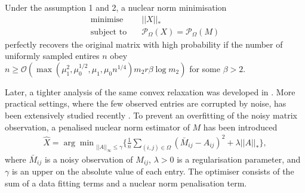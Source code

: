 \documentclass{article} %
\newcommand\mc{\mathcal} %
\begin{document}
\begin{theorem}
Under the assumption 1 and 2, a nuclear norm minimisation
\begin{align}
\text{minimise}&\quad ||X||_* \\
\text{subject to}&\quad \mc{P}_{\Omega}(X) = \mc{P}_{\Omega}(M) 
\end{align}
perfectly recovers the original matrix with high probability if the number of uniformly sampled entires $n$ obey $n\geq \mathcal{O}(\max(\mu_1^2,\mu_0^{1/2},\mu_1,\mu_0n^{1/4}) m_2 r \beta \log m_2)$ for some $\beta > 2$.
\end{theorem}
Later, a tighter analysis of the same convex relaxation was developed in \cite{candes2010power,recht2011simpler}. More practical settings, where the few observed entries are corrupted by noise, has been extensively studied recently \cite{candes2010matrix,keshavan2010matrix,negahban2012restricted,klopp2014noisy,lafond2015low}. 
To prevent an overfitting of the noisy matrix observation, a penalised nuclear norm estimator of $M$ has been introduced
\begin{align}\label{eqn:nn_est}
\hat{X} = {\arg\min}_{||{A}||_\infty \leq \gamma} \bigg\{\frac{1}{n} \sum_{(i,j) \in \Omega}(\bar{M}_{ij} - {A}_{ij})^2 + \lambda ||{A}||_* \bigg\},
\end{align}
where $\bar{M}_{ij}$ is a noisy observation of $M_{ij}$, $\lambda > 0$ is a regularisation parameter, and $\gamma$ is an upper on the absolute value of each entry. The optimiser consists of the sum of a data fitting terms and a nuclear norm penalisation term.
\end{document}
